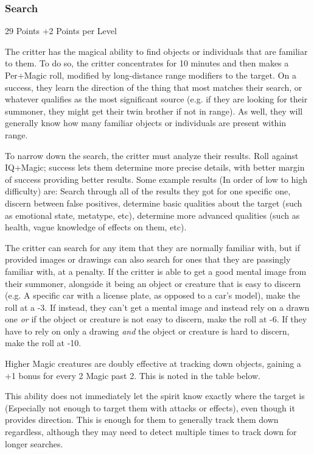 \begin{multicols*}{3}
	
	\subsubsection{Search}\label{search}
	\begin{flushright}
		29 Points +2 Points per Level
	\end{flushright}
	
	The critter has the magical ability to find objects or individuals that are familiar to them. To do so, the critter concentrates for 10 minutes and then makes a Per+Magic roll, modified by long-distance range modifiers to the target. On a success, they learn the direction of the thing that most matches their search, or whatever qualifies as the most significant source (e.g. if they are looking for their summoner, they might get their twin brother if not in range). As well, they will generally know how many familiar objects or individuals are present within range. 
	
	To narrow down the search, the critter must analyze their results. Roll against IQ+Magic; success lets them determine more precise details, with better margin of success providing better results. Some example results (In order of low to high difficulty) are: Search through all of the results they got for one specific one, discern between false positives, determine basic qualities about the target (such as emotional state, metatype, etc), determine more advanced qualities (such as health, vague knowledge of effects on them, etc).
	
	The critter can search for any item that they are normally familiar with, but if provided images or drawings can also search for ones that they are passingly familiar with, at a penalty. If the critter is able to get a good mental image from their summoner, alongside it being an object or creature that is easy to discern (e.g. A specific car with a license plate, as opposed to a car's model), make the roll at a -3. If instead, they can't get a mental image and instead rely on a drawn one \textit{or} if the object or creature is not easy to discern, make the roll at -6. If they have to rely on only a drawing \textit{and} the object or creature is hard to discern, make the roll at -10.
	
	Higher Magic creatures are doubly effective at tracking down objects, gaining a +1 bonus for every 2 Magic past 2. This is noted in the table below.
	
	This ability does not immediately let the spirit know exactly where the target is (Especially not enough to target them with attacks or effects), even though it provides direction. This is enough for them to generally track them down regardless, although they may need to detect multiple times to track down for longer searches.
	

\end{multicols*}
